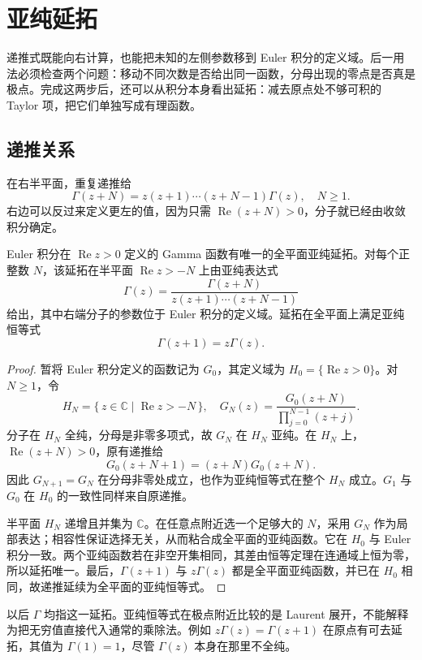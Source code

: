 \section{亚纯延拓}
\label{b3:sec:2102}

递推式既能向右计算，也能把未知的左侧参数移到 Euler 积分的定义域。后一用法必须检查两个问题：移动不同次数是否给出同一函数，分母出现的零点是否真是极点。完成这两步后，还可以从积分本身看出延拓：减去原点处不够可积的 Taylor 项，把它们单独写成有理函数。

\subsection{递推关系}
\label{b3:subsec:210201}

在右半平面，重复递推给
\[
 \Gamma(z+N)=z(z+1)\cdots(z+N-1)\Gamma(z),\quad N\ge1.
\]
右边可以反过来定义更左的值，因为只需 \(\operatorname{Re}(z+N)>0\)，分子就已经由收敛积分确定。

\begin{proposition}[递推公式的相容延拓]\label{b3:prop:21-continuation}
Euler 积分在 \(\operatorname{Re}z>0\) 定义的 Gamma 函数有唯一的全平面亚纯延拓。对每个正整数 \(N\)，该延拓在半平面 \(\operatorname{Re}z>-N\) 上由亚纯表达式
\[
 \Gamma(z)=\frac{\Gamma(z+N)}{z(z+1)\cdots(z+N-1)}
\]
给出，其中右端分子的参数位于 Euler 积分的定义域。延拓在全平面上满足亚纯恒等式
\[
 \Gamma(z+1)=z\Gamma(z).
\]
\end{proposition}
\begin{proof}
暂将 Euler 积分定义的函数记为 \(G_0\)，其定义域为 \(H_0=\{\operatorname{Re}z>0\}\)。对 \(N\ge1\)，令
\[
 H_N=\{\,z\in\mathbb C\mid\operatorname{Re}z>-N\,\},\quad
 G_N(z)=\frac{G_0(z+N)}{\prod_{j=0}^{N-1}(z+j)}.
\]
分子在 \(H_N\) 全纯，分母是非零多项式，故 \(G_N\) 在 \(H_N\) 亚纯。在 \(H_N\) 上，\(\operatorname{Re}(z+N)>0\)，原有递推给
\[
 G_0(z+N+1)=(z+N)G_0(z+N).
\]
因此 \(G_{N+1}=G_N\) 在分母非零处成立，也作为亚纯恒等式在整个 \(H_N\) 成立。\(G_1\) 与 \(G_0\) 在 \(H_0\) 的一致性同样来自原递推。

半平面 \(H_N\) 递增且并集为 \(\mathbb C\)。在任意点附近选一个足够大的 \(N\)，采用 \(G_N\) 作为局部表达；相容性保证选择无关，从而粘合成全平面的亚纯函数。它在 \(H_0\) 与 Euler 积分一致。两个亚纯函数若在非空开集相同，其差由恒等定理在连通域上恒为零，所以延拓唯一。最后，\(\Gamma(z+1)\) 与 \(z\Gamma(z)\) 都是全平面亚纯函数，并已在 \(H_0\) 相同，故递推延续为全平面的亚纯恒等式。
\end{proof}
以后 \(\Gamma\) 均指这一延拓。亚纯恒等式在极点附近比较的是 Laurent 展开，不能解释为把无穷值直接代入通常的乘除法。例如 \(z\Gamma(z)=\Gamma(z+1)\) 在原点有可去延拓，其值为 \(\Gamma(1)=1\)，尽管 \(\Gamma(z)\) 本身在那里不全纯。

